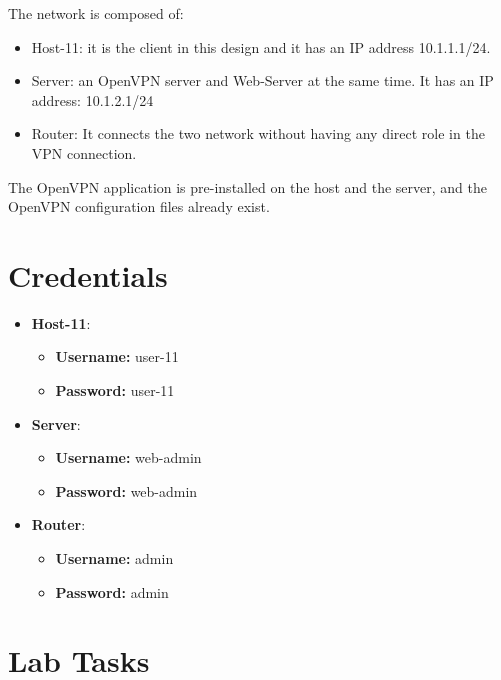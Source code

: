 The network is composed of:
\begin{itemize}
	\item Host-11: it is the client in this design and it has an IP address 10.1.1.1/24.
	\item Server: an OpenVPN server and Web-Server at the same time. It has an IP address: 10.1.2.1/24
	\item Router: It connects the two network without having any direct role in the VPN connection.
\end{itemize}

The OpenVPN application is pre-installed on the host and the server, and the OpenVPN configuration files already exist.

\section{Credentials}
\begin{itemize}
	\item \textbf{Host-11}:
	\begin{itemize}
		\item \textbf{Username:} user-11
		\item \textbf{Password:} user-11
	\end{itemize}
	\item \textbf{Server}:
	\begin{itemize}
		\item \textbf{Username:} web-admin
		\item \textbf{Password:} web-admin
	\end{itemize}
	\item \textbf{Router}:
	\begin{itemize}
		\item \textbf{Username:} admin
		\item \textbf{Password:} admin
	\end{itemize}
\end{itemize}

\section{Lab Tasks}

